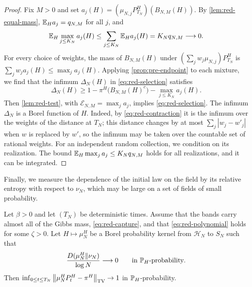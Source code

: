 \begin{proof}
Fix $M>0$ and set $a_j(H)=(\mu_{N,j}P^H_{T_N})(B_{N,M}(H))$. By \cref{lem:red-equal-mass}, $\mathbb E_Ha_j=q_{N,M}$ for all $j$, and
\begin{equation*}
\mathbb E_H\max_{j\le K_N}a_j(H)\le\sum_{j\le K_N}\mathbb E_Ha_j(H)=K_Nq_{N,M}\longrightarrow0.
\end{equation*}
For every choice of weights, the mass of $B_{N,M}(H)$ under $(\sum_jw_j\mu_{N,j})P^H_{T_N}$ is $\sum_jw_ja_j(H)\le\max_ja_j(H)$. Applying \cref{prop:pre-endpoint} to each mixture, we find that the infimum $\Delta_N(H)$ in \eqref{eq:red-selection} satisfies
\begin{equation*}
\Delta_N(H)\ge1-\pi^H\bigl(B_{N,M}(H)^c\bigr)-\max_{j\le K_N}a_j(H).
\end{equation*}
Then \cref{lem:red-test}, with $\mathcal E_{N,M}=\max_ja_j$, implies \eqref{eq:red-selection}. The infimum $\Delta_N$ is a Borel function of $H$. Indeed, by \eqref{eq:red-contraction} it is the infimum over the weights of the distance at $T_N$; this distance changes by at most $\sum_j|w_j-w'_j|$ when $w$ is replaced by $w'$, so the infimum may be taken over the countable set of rational weights. For an independent random collection, we condition on its realization. The bound $\mathbb E_H\max_ja_j\le K_Nq_{N,M}$ holds for all realizations, and it can be integrated.
\end{proof}

Finally, we measure the dependence of the initial law on the field by its relative entropy with respect to $\nu_N$, which may be large on a set of fields of small probability.

\begin{corollary}\label{cor:red-entropy}
Let $\beta>0$ and let $(T_N)$ be deterministic times. Assume that the bands carry almost all of the Gibbs mass, \eqref{eq:red-capture}, and that \eqref{eq:red-polynomial} holds for some $\zeta>0$. Let $H\mapsto\mu^H_N$ be a Borel probability kernel from $\mathcal H_N$ to $S_N$ such that
\begin{equation}\label{eq:red-entropy}
\frac{D(\mu^H_N\Vert\nu_N)}{\log N}\longrightarrow0\qquad\text{in }\mathbb P_H\text{-probability}.
\end{equation}
Then $\inf_{0\le t\le T_N}\left\lVert\mu^H_NP^H_t-\pi^H\right\rVert_{\mathrm{TV}}\to1$ in $\mathbb P_H$-probability.
\end{corollary}

